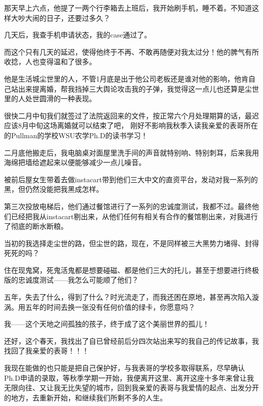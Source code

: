 \documentclass[9pt, b5paper]{article}
\begin{document}
那天早上六点，他提了一两个行李箱去上班后，我开始刷手机，睡不着。不知道这样大吵大闹的日子，还要过多久？

几天后，我查手机申请状态，我的case通过了。

而这个只有几天的延迟，使得他终于不再、不敢再随便对我太过分！他的脾气有所收捻，人也变得温和了很多。 

他是生活城尘世里的人，不管1月底是出于他公司老板还是谁对他的影响，他肯自己站出来提离婚，帮我挡掉三大舆论攻击我的子弹，我觉得这一点儿也还算是尘世里的人处世圆滑的一种表现。 

很快二月中旬我们就签过了法院返回来的文件，按正常六个月处理期算的话，最迟应该8月中旬这场离婚就可以结束了吧， 刚好不影响我秋季入读我亲爱的表哥所在的Pullman的学校WSU农学Ph.D的读书学习！

二月底他搬走后，我电脑桌对面屋里洗手间的声音就特别响、特别刺耳，后来我用海绵把墙给遮起来以便能够减少一点儿噪音。

被前后屋女生带着去做instacart带到他们三大中文的直资平台，发动对我一系列的黑，但仍然没能把我黑成怎样。

第三次投放电梯后，他们通过餐馆进行了一系列的忠诚度测试，我都不过。最终他们已经把我从instacart剔出来，从他们任何有相关有合作的餐馆剔出来，对我进行了彻底的断水断粮。

当初的我选择走尘世的路，但尘世的路，现在，不是同样被三大黑势力堵得、封得死死的吗？

住在现鬼窝，死鬼活鬼都是想要碰磁、都是他们三大的托儿，甚至于想要进行终极版的忠诚度测试——我怎么可能顺了他们？

五年，失去了什么，得到了什么？时光流走了，而我还困在原地，甚至再次陷入漩涡。用五年的时间去换一张没有任何价值的绿卡，你愿意吗？

我——这个天地之间孤独的孩子，终于成了这个美丽世界的孤儿！

还好，这个春天，我找出了自已曾经前后分四次站出来写的我自己的传记故事，我找回了我亲爱的表哥！！！

我现在能做的也只能是把自己保护好，与我表哥的学校多取得联系，尽早确认Ph.D申请的录取，等秋季学期一开始，我便离开这里、离开这座十多年来曾让我无限向往、又让我无比失望的城市，回到我亲爱的表哥与我爱情的起点、出发分开的地方，去重新开始，和继续我们所剩不多的人生。 
\end{document}
